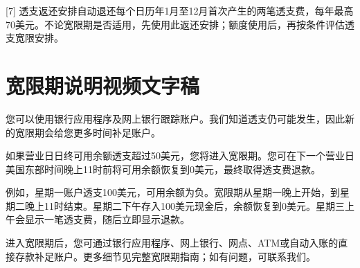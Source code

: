 \documentclass[UTF8,fontset=none,11pt,a4paper]{ctexart}
\begin{document}
[7] 透支返还安排自动退还每个日历年1月至12月首次产生的两笔透支费，每年最高70美元。不论宽限期是否适用，先使用此返还安排；额度使用后，再按条件评估透支\allowbreak\mbox{宽限安排。}


\section*{宽限期说明视频文字稿}
您可以使用银行应用程序及网上银行跟踪账户。我们知道透支仍可能发生，因此新的宽限期会给您更多时间\allowbreak\mbox{补足账户。}


如果营业日日终可用余额透支超过50美元，您将进入宽限期。您可在下一个营业日美国东部时间晚上11时前将可用余额恢复到0美元，最终取得透\allowbreak\mbox{支费退款。}


例如，星期一账户透支100美元，可用余额为负。宽限期从星期一晚上开始，到星期二晚上11时结束。星期二下午存入100美元现金后，余额恢复到0美元。星期三上午会显示一笔透支费，随后立即\allowbreak\mbox{显示退款。}


进入宽限期后，您可通过银行应用程序、网上银行、网点、ATM或自动入账的直接存款补足账户。更多细节见完整宽限期指南；如有问题，可\allowbreak\mbox{联系我们。}
\end{document}

